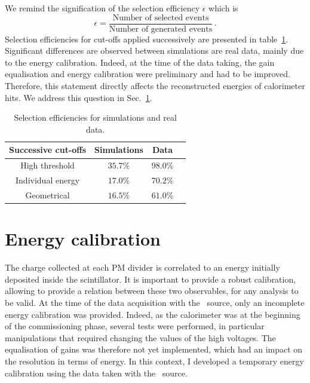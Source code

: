 We remind the signification of the selection efficiency $\epsilon$ which is
\begin{equation}
  \epsilon = \frac{\text{Number of selected events}}{\text{Number of generated events}}\,.
\end{equation}
Selection efficiencies for cut-offs applied successively are presented in table~\ref{tab:Co_cut_eff}.
Significant differences are observed between simulations are real data, mainly due to the energy calibration.
Indeed, at the time of the data taking, the gain equalisation and energy calibration were preliminary and had to be improved.
Therefore, this statement directly affects the reconstructed energies of calorimeter hits.
We address this question in Sec.~\ref{subsec:Co_energy_calib}.
\begin{table}[h]
  \centering
  \begin{tabular}{|c|c|c|c|}
    \hline
    Successive cut-offs & Simulations & Data \\
    \hline\hline
    High threshold & $35.7$\% & $98.0$\% \\
    Individual energy & $17.0$\% & $70.2$\% \\
    Geometrical & $16.5$\% & $61.0$\% \\
    \hline
  \end{tabular}
  \caption{Selection efficiencies for simulations and real data.
    \label{tab:Co_cut_eff}}
\end{table}



\section{Energy calibration}
\label{subsec:Co_energy_calib}

The charge collected at each PM divider is correlated to an energy initially deposited inside the scintillator.
It is important to provide a robust calibration, allowing to provide a relation between these two observables, for any analysis to be valid.
At the time of the data acquisition with the \Co\ source, only an incomplete energy calibration was provided.
Indeed, as the calorimeter was at the beginning of the commissioning phase, several tests were performed, in particular manipulations that required changing the values of the high voltages.
The equalisation of gains was therefore not yet implemented, which had an impact on the resolution in terms of energy.
In this context, I developed a temporary energy calibration using the data taken with the \Co\ source.

